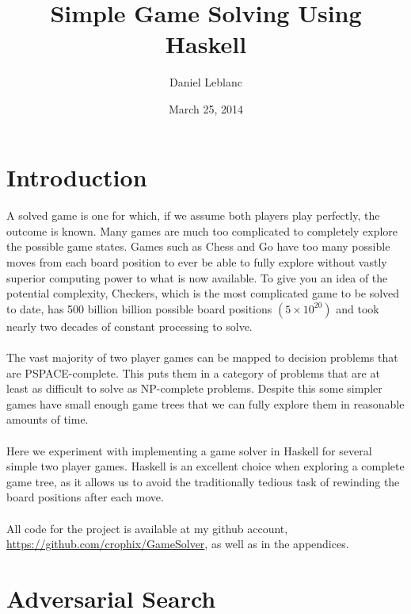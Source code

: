 \documentclass[10pt]{article}
\title{\bf Simple Game Solving Using Haskell}
\author{Daniel Leblanc}
\date{March 25, 2014}
\begin{document}
\maketitle

\section{Introduction}
\paragraph{} A solved game is one for which, if we assume both players play perfectly,
    the outcome is known.  Many games are much too complicated to completely explore
    the possible game states.  Games such as Chess and Go have too many 
    possible moves from each board position to ever be able to fully explore without 
    vastly superior computing power to what is now available.  To give you an idea 
    of the potential complexity, Checkers, which is the most complicated game to be
    solved to date, has 500 billion billion possible board positions $(5 \times 10^{20})$
    \cite{checkersSolved} and took nearly two decades of constant processing to solve. 
\paragraph{} The vast majority of
    two player games can be mapped to decision problems that are PSPACE-complete.  This
    puts them in a category of problems that are at least as difficult to solve as 
    NP-complete problems.  Despite this some simpler games have small enough game trees
    that we can fully explore them in reasonable amounts of time.
\paragraph{} Here we experiment with implementing a game solver in Haskell for several 
    simple two player games.  Haskell is an excellent choice when exploring a complete 
    game tree, as it allows us to avoid the traditionally tedious task of rewinding 
    the board positions after each move.
\paragraph{} All code for the project is available at my github account, 
    \url{https://github.com/crophix/GameSolver}, as well as in the appendices.

\section{Adversarial Search}
\end{document}
